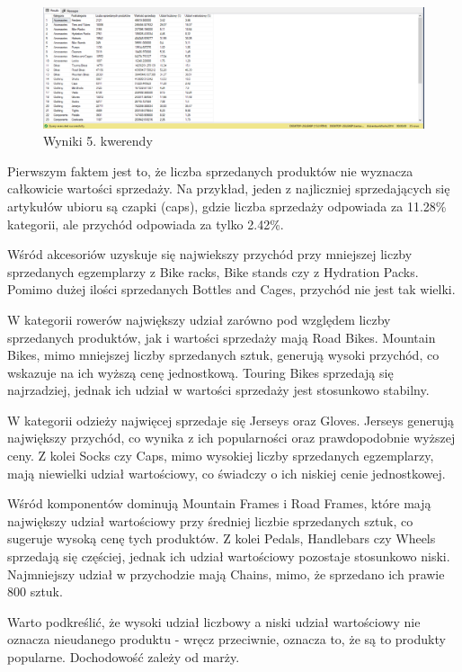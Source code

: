 \documentclass[a4paper,12pt]{article}
\begin{document}
\begin{figure}[H]
	\centering
	\includegraphics[width=1.0\textwidth]{images/5.png}
	\caption{Wyniki 5. kwerendy}
\end{figure}

Pierwszym faktem jest to, że liczba sprzedanych produktów nie wyznacza całkowicie wartości sprzedaży. Na przykład, jeden z najliczniej sprzedających się artykułów ubioru są czapki (caps), gdzie liczba sprzedaży odpowiada za 11.28\% kategorii, ale przychód odpowiada za tylko 2.42\%.

Wśród akcesoriów uzyskuje się najwiekszy przychód przy mniejszej liczby sprzedanych egzemplarzy z Bike racks, Bike stands czy z Hydration Packs. Pomimo dużej ilości sprzedanych Bottles and Cages, przychód nie jest tak wielki.

W kategorii rowerów największy udział zarówno pod względem liczby sprzedanych produktów, jak i wartości sprzedaży mają Road Bikes. Mountain Bikes, mimo mniejszej liczby sprzedanych sztuk, generują wysoki przychód, co wskazuje na ich wyższą cenę jednostkową. Touring Bikes sprzedają się najrzadziej, jednak ich udział w wartości sprzedaży jest stosunkowo stabilny.

W kategorii odzieży najwięcej sprzedaje się Jerseys oraz Gloves. Jerseys generują największy przychód, co wynika z ich popularności oraz prawdopodobnie wyższej ceny. Z kolei Socks czy Caps, mimo wysokiej liczby sprzedanych egzemplarzy, mają niewielki udział wartościowy, co świadczy o ich niskiej cenie jednostkowej.

Wśród komponentów dominują Mountain Frames i Road Frames, które mają największy udział wartościowy przy średniej liczbie sprzedanych sztuk, co sugeruje wysoką cenę tych produktów. Z kolei Pedals, Handlebars czy Wheels sprzedają się częściej, jednak ich udział wartościowy pozostaje stosunkowo niski. Najmniejszy udział w przychodzie mają Chains, mimo, że sprzedano ich prawie 800 sztuk.

Warto podkreślić, że wysoki udział liczbowy a niski udział wartościowy nie oznacza nieudanego produktu - wręcz przeciwnie, oznacza to, że są to produkty popularne. Dochodowość zależy od marży.
\end{document}
